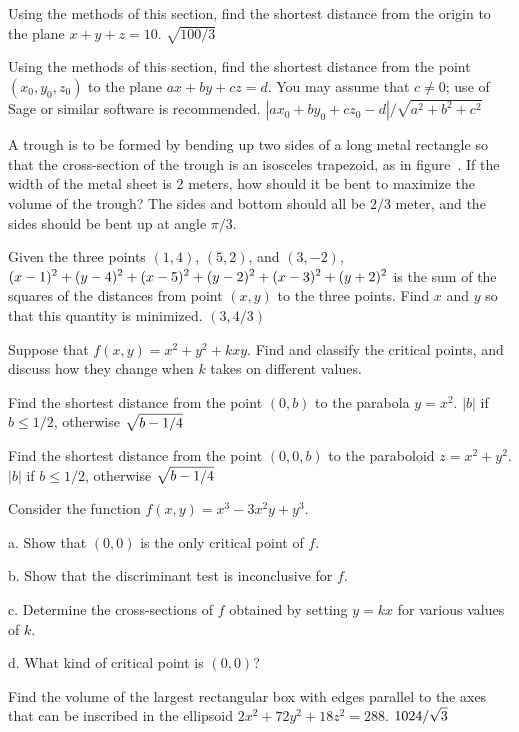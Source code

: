 \exercise Using the methods of this section, find the shortest
distance from the origin to the plane $x+y+z=10$.
\answer $\sqrt{100/3}$
\endanswer
\endexercise

\exercise Using the methods of this section, find the shortest
distance from the point $(x_0,y_0,z_0)$ to the plane $ax+by+cz=d$.
You may assume that $c\not=0$; use of Sage or similar software
is recommended.
\answer $|ax_0+by_0+cz_0-d|/\sqrt{a^2+b^2+c^2}$
\endanswer
\endexercise

\exercise A trough is to be formed by bending up two sides of a long
metal rectangle
so that the cross-section of the trough is an isosceles trapezoid, as
in figure~. If the width of the metal sheet is 2
meters, how should it be bent to maximize the volume of the trough?
\answer The sides and bottom should all be $2/3$ meter, and the sides
should be bent up at angle $\pi/3$.
\endanswer
\endexercise

\exercise Given the three points $(1,4)$, $(5,2)$, and $(3,-2)$, 
$\displaystyle(x-1)^2+(y-4)^2+(x-5)^2+(y-2)^2+(x-3)^2+(y+2)^2$
is the sum of the squares of the distances from point $(x,y)$ to the
three points. Find $x$ and $y$ so that this quantity is minimized.
\answer $(3,4/3)$
\endanswer
\endexercise

\exercise Suppose that $f(x,y)=x^2+y^2+kxy$. Find and classify the
  critical points, and discuss how they change when $k$ takes on
  different values.
\endexercise

\exercise Find the shortest distance from the point $(0,b)$ to the
  parabola $y=x^2$.
\answer $|b|$ if $b\le1/2$, otherwise $\displaystyle\sqrt{b-1/4}$
\endanswer
\endexercise

\exercise Find the shortest distance from the point $(0,0,b)$ to the
  paraboloid $z=x^2+y^2$.
\answer $|b|$ if $b\le1/2$, otherwise $\displaystyle\sqrt{b-1/4}$
\endanswer
\endexercise

\exercise Consider the function $f(x,y)=x^3-3x^2y+y^3$.

\beginlist
\item{a.} Show that $(0,0)$ is the only critical point of $f$.

\item{b.} Show that the discriminant test is inconclusive for $f$.  

\item{c.} Determine the cross-sections of $f$ obtained by setting $y=kx$ for
  various values of $k$.

\item{d.} What kind of critical point is $(0,0)$?

\endlist
\endexercise

\exercise Find the volume of the largest rectangular box with edges
  parallel to the axes that can be inscribed in the ellipsoid
  $2x^2+72y^2+18z^2=288$.
\answer $\displaystyle 1024/\sqrt3$
\endanswer
\endexercise

\endexercises

